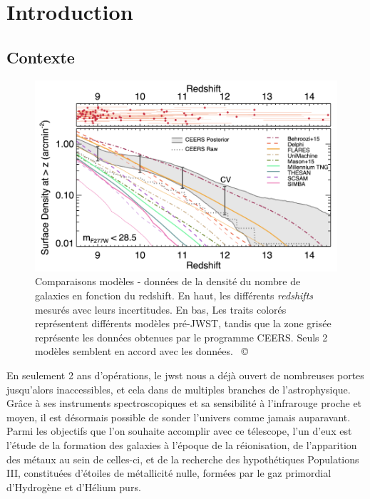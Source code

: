 \documentclass[12pt, a4paper]{article}
\newcommand{\customcite}[1]{\mbox{
  {\small \copyright} \cite{#1}}
}
\begin{document}
\section{Introduction}

\subsection{Contexte}

\begin{figure}
  \centering
  \includegraphics[scale=0.5]{assets/ceers_number_galaxies.png}
  \caption{Comparaisons modèles - données de la densité du nombre de galaxies en fonction du redshift. En haut, les différents \textit{redshifts} mesurés avec leurs incertitudes. En bas, Les traits colorés représentent différents modèles pré-JWST, tandis que la zone grisée représente les données obtenues par le programme CEERS. Seuls 2 modèles semblent en accord avec les données. \customcite{2023arXiv231104279F}}
  \label{fig:densite_galaxies}
\end{figure}

En seulement 2 ans d'opérations, le \gls{jwst} nous a déjà ouvert de nombreuses portes jusqu'alors inaccessibles, et cela dans de multiples branches de l'astrophysique. Grâce à ses instruments spectroscopiques et sa sensibilité à l'infrarouge proche et moyen, il est désormais possible de sonder l'univers comme jamais auparavant. Parmi les objectifs que l'on souhaite accomplir avec ce télescope, l'un d'eux est l'étude de la formation des galaxies à l'époque de la réionisation, de l'apparition des métaux au sein de celles-ci, et de la recherche des hypothétiques Populations III, constituées d'étoiles de métallicité nulle, formées par le gaz primordial d'Hydrogène et d'Hélium purs.
\end{document}

